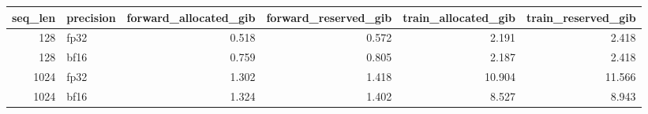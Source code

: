 \begin{tabular}{rlrrrr}
\toprule
seq\_len & precision & forward\_allocated\_gib & forward\_reserved\_gib & train\_allocated\_gib & train\_reserved\_gib \\
\midrule
128 & fp32 & 0.518 & 0.572 & 2.191 & 2.418 \\
128 & bf16 & 0.759 & 0.805 & 2.187 & 2.418 \\
1024 & fp32 & 1.302 & 1.418 & 10.904 & 11.566 \\
1024 & bf16 & 1.324 & 1.402 & 8.527 & 8.943 \\
\bottomrule
\end{tabular}
